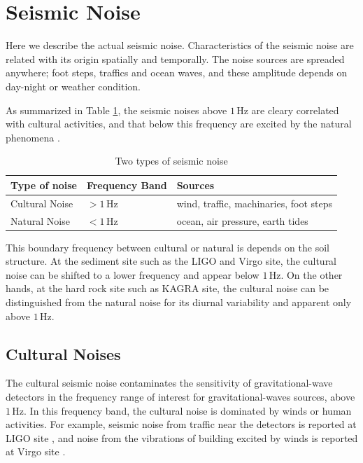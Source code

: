 \section{Seismic Noise}\label{sec:32}
Here we describe the actual seismic noise. Characteristics of the seismic noise are related with its origin spatially and temporally. The noise sources are spreaded anywhere; foot steps, traffics and ocean waves, and these amplitude depends on day-night or weather condition.

As summarized in Table \ref{tb:31}, the seismic noises above $1\,\mathrm{Hz}$ are cleary correlated with cultural activities, and that below this frequency are excited by the natural phenomena \cite{bonnefoy2006nature}.
\begin{table}[h] 
  \begin{center}
    \caption{Two types of seismic noise}\label{tb:31}
    \begin{tabular}{lll} 
      \hline      
      Type of noise & Frequency Band & Sources \\ \hline \hline
      Cultural Noise & $> 1\,\mathrm{Hz}$ & wind, traffic, machinaries, foot steps\\
      Natural Noise  & $< 1\,\mathrm{Hz}$ & ocean, air pressure, earth tides\\
    \end{tabular}
  \end{center}
\end{table}

This boundary frequency between cultural or natural is depends on the soil structure. At the sediment site such as the LIGO\cite{Daw_2004} and Virgo site\cite{Beker_2012}, the cultural noise can be shifted to a lower frequency and appear below $1\,\mathrm{Hz}$. On the other hands, at the hard rock site such as KAGRA site, the cultural noise can be distinguished from the natural noise for its diurnal variability and apparent only above $1\,\mathrm{Hz}$.


\subsection{Cultural Noises} \label{sec:321}
The cultural seismic noise contaminates the sensitivity of gravitational-wave detectors in the frequency range of interest for gravitational-waves sources, above $1\,\mathrm{Hz}$. In this frequency band, the cultural noise is dominated by winds or human activities. For example, seismic noise from traffic near the detectors is reported at LIGO site \cite{schofield2000source}, and noise from the vibrations of building excited by winds is reported at Virgo site \cite{acernese2004properties}. 

